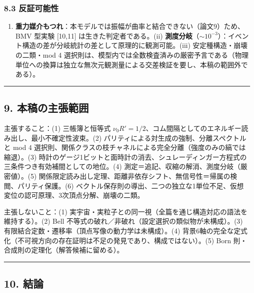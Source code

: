 \documentclass[
]{ltjsarticle}
\providecommand{\tightlist}{%
  \setlength{\itemsep}{0pt}\setlength{\parskip}{0pt}}
\begin{document}
\subsubsection{8.3 反証可能性}\label{ux53cdux8a3cux53efux80fdux6027}

\begin{enumerate}
\def\labelenumi{(\roman{enumi})}
\tightlist
\item
  \textbf{重力媒介もつれ}：本モデルでは振幅が曲率と結合できない（論文9）ため、BMV
  型実験 {[}10,11{]} は生きた判定者である。(ii)
  \textbf{測度分岐}（\(\sim10^{-3}\)）：イベント構造の差が分岐統計の差として原理的に観測可能。(iii)
  安定種構造・崩壊の二類・mod 4
  選択則は、模型内では全数検査済みの厳密予言である（物理単位への換算は独立な無次元観測量による交差検証を要し、本稿の範囲外である）。
\end{enumerate}

\begin{center}\rule{0.5\linewidth}{0.5pt}\end{center}

\subsection{9.
本稿の主張範囲}\label{ux672cux7a3fux306eux4e3bux5f35ux7bc4ux56f2}

主張すること：(1) 三帳簿と恒等式
\(\nu_0R'=1/2\)、コム間隔としてのエネルギー読み出し、最小不確定性波束。(2)
パリティによる対生成の強制、分離スペクトルと mod 4
選択則、関係クラスの枝チャネルによる完全分離（強度のみの縞では縮退）。(3)
時計のゲージ1ビットと面時計の消去、シュレーディンガー方程式の三条件つき有効補間としての地位。(4)
測定＝追記、収縮の解消、測度分岐（厳密値）。(5)
関係限定読み出し定理、距離非依存シフト、無信号性＝帰属の検閲、パリティ保護。(6)
ベクトル保存則の導出、二つの独立な1単位不足、仮想変位の認可原理、3次頂点分解、崩壊の二類。

主張しないこと：(1)
実宇宙・実粒子との同一視（全篇を通じ構造対応の語法を維持する）。(2) Bell
不等式の破れ／非破れ（設定選択の類似物が未構成）。(3)
有限結合定数・遷移率（頂点写像の動力学は未構成）。(4)
背景6軸の完全な定式化（不可視方向の存在証明は不足の発見であり、構成ではない）。(5)
Born 則・合成則の定理化（解答候補に留める）。

\begin{center}\rule{0.5\linewidth}{0.5pt}\end{center}

\subsection{10. 結論}\label{ux7d50ux8ad6}
\end{document}
